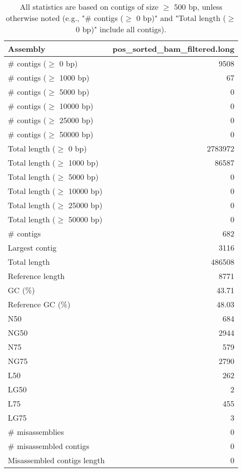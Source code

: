 \documentclass[12pt,a4paper]{article}
\begin{document}
\begin{table}[ht]
\begin{center}
\caption{All statistics are based on contigs of size $\geq$ 500 bp, unless otherwise noted (e.g., "\# contigs ($\geq$ 0 bp)" and "Total length ($\geq$ 0 bp)" include all contigs).}
\begin{tabular}{|l*{1}{|r}|}
\hline
Assembly & pos\_sorted\_bam\_filtered.long \\ \hline
\# contigs ($\geq$ 0 bp) & 9508 \\ \hline
\# contigs ($\geq$ 1000 bp) & 67 \\ \hline
\# contigs ($\geq$ 5000 bp) & 0 \\ \hline
\# contigs ($\geq$ 10000 bp) & 0 \\ \hline
\# contigs ($\geq$ 25000 bp) & 0 \\ \hline
\# contigs ($\geq$ 50000 bp) & 0 \\ \hline
Total length ($\geq$ 0 bp) & 2783972 \\ \hline
Total length ($\geq$ 1000 bp) & 86587 \\ \hline
Total length ($\geq$ 5000 bp) & 0 \\ \hline
Total length ($\geq$ 10000 bp) & 0 \\ \hline
Total length ($\geq$ 25000 bp) & 0 \\ \hline
Total length ($\geq$ 50000 bp) & 0 \\ \hline
\# contigs & 682 \\ \hline
Largest contig & 3116 \\ \hline
Total length & 486508 \\ \hline
Reference length & 8771 \\ \hline
GC (\%) & 43.71 \\ \hline
Reference GC (\%) & 48.03 \\ \hline
N50 & 684 \\ \hline
NG50 & 2944 \\ \hline
N75 & 579 \\ \hline
NG75 & 2790 \\ \hline
L50 & 262 \\ \hline
LG50 & 2 \\ \hline
L75 & 455 \\ \hline
LG75 & 3 \\ \hline
\# misassemblies & 0 \\ \hline
\# misassembled contigs & 0 \\ \hline
Misassembled contigs length & 0 \\ \hline

\end{tabular}
\end{center}
\end{table}
\end{document}

